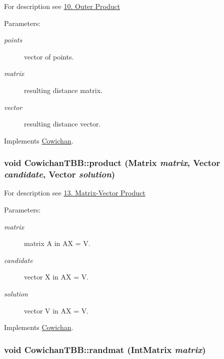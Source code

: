 For description see \hyperlink{index_outer_sec}{10. Outer Product} \begin{Desc}
\item[Parameters:]
\begin{description}
\item[{\em points}]vector of points. \item[{\em matrix}]resulting distance matrix. \item[{\em vector}]resulting distance vector. \end{description}
\end{Desc}


Implements \hyperlink{class_cowichan_52f17221019290b88334b0ca7f3bcdb9}{Cowichan}.\hypertarget{class_cowichan_t_b_b_f3144458520e2dff1f9fad5753f6fc3d}{
\subsubsection[{product}]{\setlength{\rightskip}{0pt plus 5cm}void CowichanTBB::product ({\bf Matrix} {\em matrix}, \/  {\bf Vector} {\em candidate}, \/  {\bf Vector} {\em solution})}}
\label{class_cowichan_t_b_b_f3144458520e2dff1f9fad5753f6fc3d}


For description see \hyperlink{index_product_sec}{13. Matrix-Vector Product} \begin{Desc}
\item[Parameters:]
\begin{description}
\item[{\em matrix}]matrix A in AX = V. \item[{\em candidate}]vector X in AX = V. \item[{\em solution}]vector V in AX = V. \end{description}
\end{Desc}


Implements \hyperlink{class_cowichan_3d7d4b581a1d6f0392dc452830fb3b03}{Cowichan}.\hypertarget{class_cowichan_t_b_b_b9b5cb4b4b5dc8907b2a01825cd4aaff}{
\subsubsection[{randmat}]{\setlength{\rightskip}{0pt plus 5cm}void CowichanTBB::randmat ({\bf IntMatrix} {\em matrix})}}
\label{class_cowichan_t_b_b_b9b5cb4b4b5dc8907b2a01825cd4aaff}


